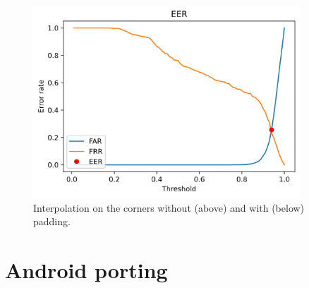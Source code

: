 \documentclass{article}
\begin{document}
\blindtext

\begin{figure}[H]
    \label{fig:eer}
    \begin{center}
        \includegraphics[width=10cm,keepaspectratio]{images/eer.png}
        \caption{Interpolation on the corners without (above) and with (below) padding.}
    \end{center}
\end{figure}

\blindtext

\section{Android porting}
\end{document}
